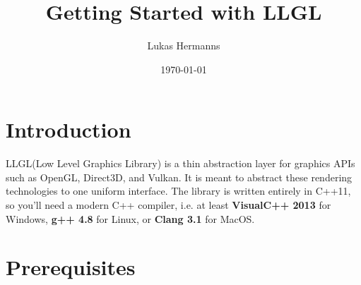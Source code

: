 \documentclass{article}
\title{Getting Started with LLGL}
\author{Lukas Hermanns}
\date{\today}
\begin{document}

\def\LLGL{\textcolor{darkBlueColor}{LLGL}\xspace}


\maketitle



\section*{Introduction}

\LLGL (Low Level Graphics Library) is a thin abstraction layer for graphics APIs such as
OpenGL, Direct3D, and Vulkan. It is meant to abstract these rendering technologies to one uniform interface.
The library is written entirely in C++11, so you'll
need a modern C++ compiler, i.e. at least \textbf{VisualC++ 2013} for Windows,
\textbf{g++ 4.8} for Linux, or \textbf{Clang 3.1} for MacOS.



\section*{Prerequisites}
\end{document}
